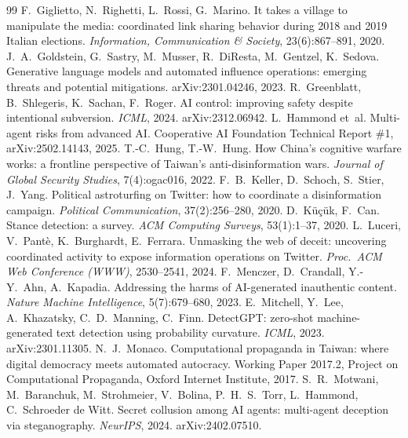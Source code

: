 \documentclass[10pt]{article}
\begin{document}
\begin{thebibliography}{99}
 F.~Giglietto, N.~Righetti, L.~Rossi, G.~Marino. It takes a village to manipulate the media: coordinated link sharing behavior during 2018 and 2019 Italian elections. \emph{Information, Communication \& Society}, 23(6):867--891, 2020.
 J.~A.~Goldstein, G.~Sastry, M.~Musser, R.~DiResta, M.~Gentzel, K.~Sedova. Generative language models and automated influence operations: emerging threats and potential mitigations. arXiv:2301.04246, 2023.
 R.~Greenblatt, B.~Shlegeris, K.~Sachan, F.~Roger. AI control: improving safety despite intentional subversion. \emph{ICML}, 2024. arXiv:2312.06942.
 L.~Hammond et~al. Multi-agent risks from advanced AI. Cooperative AI Foundation Technical Report \#1, arXiv:2502.14143, 2025.
 T.-C.~Hung, T.-W.~Hung. How China's cognitive warfare works: a frontline perspective of Taiwan's anti-disinformation wars. \emph{Journal of Global Security Studies}, 7(4):ogac016, 2022.
 F.~B.~Keller, D.~Schoch, S.~Stier, J.~Yang. Political astroturfing on Twitter: how to coordinate a disinformation campaign. \emph{Political Communication}, 37(2):256--280, 2020.
 D.~K\"u\c{c}\"uk, F.~Can. Stance detection: a survey. \emph{ACM Computing Surveys}, 53(1):1--37, 2020.
 L.~Luceri, V.~Pant\`e, K.~Burghardt, E.~Ferrara. Unmasking the web of deceit: uncovering coordinated activity to expose information operations on Twitter. \emph{Proc.\ ACM Web Conference (WWW)}, 2530--2541, 2024.
 F.~Menczer, D.~Crandall, Y.-Y.~Ahn, A.~Kapadia. Addressing the harms of AI-generated inauthentic content. \emph{Nature Machine Intelligence}, 5(7):679--680, 2023.
 E.~Mitchell, Y.~Lee, A.~Khazatsky, C.~D.~Manning, C.~Finn. DetectGPT: zero-shot machine-generated text detection using probability curvature. \emph{ICML}, 2023. arXiv:2301.11305.
 N.~J.~Monaco. Computational propaganda in Taiwan: where digital democracy meets automated autocracy. Working Paper 2017.2, Project on Computational Propaganda, Oxford Internet Institute, 2017.
 S.~R.~Motwani, M.~Baranchuk, M.~Strohmeier, V.~Bolina, P.~H.~S.~Torr, L.~Hammond, C.~Schroeder de Witt. Secret collusion among AI agents: multi-agent deception via steganography. \emph{NeurIPS}, 2024. arXiv:2402.07510.

\end{thebibliography}
\end{document}
